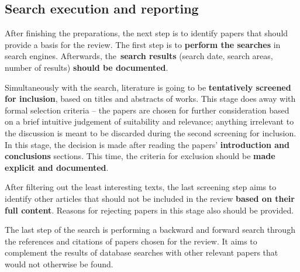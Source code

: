 \subsection{Search execution and reporting}\label{subsec:search-execution-and-reporting}

After finishing the preparations, the next step is to identify papers that should provide a basis for the review.
The first step is to \textbf{perform the searches} in search engines.
Afterwards, the\ \textbf{search results} (search date, search areas, number of results) \textbf{should be documented}.

Simultaneously with the search, literature is going to be \textbf{tentatively screened for inclusion}, based on titles and abstracts of works.
This stage does away with formal selection criteria -- the papers are chosen for further consideration based on a brief intuitive judgement of suitability and relevance;
anything irrelevant to the discussion is meant to be discarded during the second screening for inclusion.
In this stage, the decision is made after reading the papers' \textbf{introduction and conclusions} sections.
This time, the criteria for exclusion should be \textbf{made explicit and documented}.

After filtering out the least interesting texts, the last screening step aims to identify other articles
that should not be included in the review \textbf{based on their full content}.
Reasons for rejecting papers in this stage also should be provided.

The last step of the search is performing a backward and forward search through the references and citations of papers chosen for the review.
It aims to complement the results of database searches with other relevant papers that would not otherwise be found.

